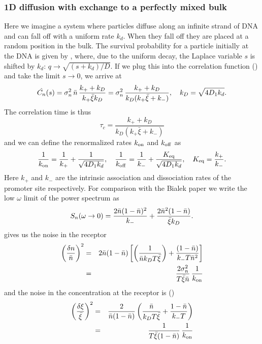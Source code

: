 \subsubsection{1D diffusion with exchange to a perfectly mixed bulk}
Here we imagine a system where particles diffuse along an infinite strand of DNA and can fall off with a uniform rate $k_d$. When they fall off they are placed at a random position in the bulk. The survival probability for a particle initially at the DNA is given by , where, due to the uniform decay, the Laplace variable $s$ is shifted by $k_d$: $q \rightarrow \sqrt{(s+k_d)/D}$. If we plug this into the correlation function () and take the limit $s \rightarrow 0$, we arrive at
\begin{equation}
 \hat{C_n}(s) = \sigma_n^2 \, \bar{n} \, \frac{k_+ + k_D}{k_+ \bar{\xi} k_D} = \sigma_n^2 \, \frac{k_+ + k_D}{k_D (k_+ \bar{\xi} + k_-)}, \quad k_D = \sqrt{4 D_1 k_d}.
 \elabel{LapCorr25D}
\end{equation}
The correlation time is thus
\begin{equation}
 \tau_c = \frac{k_+ + k_D}{k_D (k_+ \bar{\xi} + k_-)}
\end{equation}
and we can define the renormalized rates $k_{\rm on}$ and $k_{\rm off}$ as
\begin{equation}
 \frac{1}{k_{\rm on}} = \frac{1}{k_+} + \frac{1}{\sqrt{4 D_1 k_d}}, \quad \frac{1}{k_{\rm off}} = \frac{1}{k_-} + \frac{K_{\rm eq}}{\sqrt{4 D_1 k_d}}, \quad K_{\rm eq} = \frac{k_+}{k_-}.
\end{equation}
Here $k_+$ and $k_-$ are the intrinsic association and dissociation rates of the promoter site respectively. For comparison with the Bialek paper we write the low $\omega$ limit of the power spectrum as
\begin{equation}
 S_n(\omega \rightarrow 0) = \frac{2 \bar{n}(1-\bar{n})^2}{k_-} + \frac{2\bar{n}^2(1-\bar{n})}{\bar{\xi} k_D}.
 \elabel{SnWMJ}
\end{equation}
 gives us the noise in the receptor
\begin{eqnarray}
 \left( \frac{\delta n}{\bar{n}} \right)^2 & = & 2 \bar{n}(1-\bar{n})\left[\left( \frac{1}{\bar{n} k_D T \bar{\xi}} \right)+\frac{(1-\bar{n})}{k_- T \bar{n}^2} \right] \\
 & = & \frac{2 \sigma_n^2}{T \bar{\xi} \bar{n}} \, \frac{1}{k_{\rm on}}
 \elabel{NPWMJ}
\end{eqnarray}
and the noise in the concentration at the receptor is ()
\begin{eqnarray}
 \left( \frac{\delta \xi}{\bar{\xi}} \right)^2 & = & \frac{2}{\bar{n}(1-\bar{n})} \left( \frac{\bar{n}}{k_D T \bar{\xi}} + \frac{1-\bar{n}}{k_- T}  \right) \\
  & = & \frac{1}{T \bar{\xi} (1 - \bar{n})} \, \frac{1}{k_{\rm on}}
 \elabel{NCWMJ}
\end{eqnarray}

